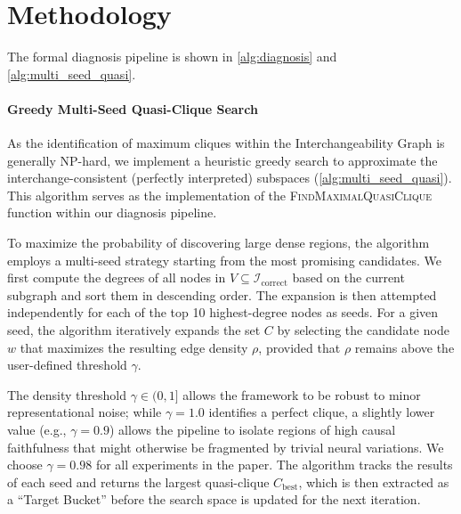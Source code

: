 \section{Methodology}
\label{appendix:method}
The formal diagnosis pipeline is shown in \cref{alg:diagnosis} and \cref{alg:multi_seed_quasi}. 

\paragraph{Greedy Multi-Seed Quasi-Clique Search}
As the identification of maximum cliques within the Interchangeability Graph is generally NP-hard, we implement a heuristic greedy search to approximate the interchange-consistent (perfectly interpreted) subspaces (\cref{alg:multi_seed_quasi}).
This algorithm serves as the implementation of the \textsc{FindMaximalQuasiClique} function within our diagnosis pipeline. 

To maximize the probability of discovering large dense regions, the algorithm employs a multi-seed strategy starting from the most promising candidates. %
We first compute the degrees of all nodes in $V \subseteq \mathcal{I}_{\mathrm{correct}}$ based on the current subgraph and sort them in descending order. %
The expansion is then attempted independently for each of the top 10 highest-degree nodes as seeds. %
For a given seed, the algorithm iteratively expands the set $C$ by selecting the candidate node $w$ that maximizes the resulting edge density $\rho$, provided that $\rho$ remains above the user-defined threshold $\gamma$. %

The density threshold $\gamma \in (0, 1]$ allows the framework to be robust to minor representational noise; while $\gamma=1.0$ identifies a perfect clique, a slightly lower value (e.g., $\gamma=0.9$) allows the pipeline to isolate regions of high causal faithfulness that might otherwise be fragmented by trivial neural variations. We choose $\gamma = 0.98$ for all experiments in the paper. 
The algorithm tracks the results of each seed and returns the largest quasi-clique $C_{\mathrm{best}}$, which is then extracted as a ``Target Bucket'' before the search space is updated for the next iteration. %

